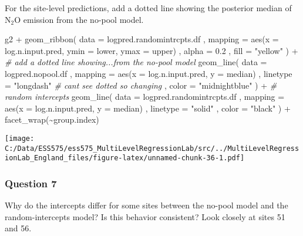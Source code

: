 \documentclass[
]{article}
\newenvironment{Shaded}{\begin{snugshade}}{\end{snugshade}}
\newcommand{\AttributeTok}[1]{\textcolor[rgb]{0.77,0.63,0.00}{#1}}
\newcommand{\CommentTok}[1]{\textcolor[rgb]{0.56,0.35,0.01}{\textit{#1}}}
\newcommand{\FloatTok}[1]{\textcolor[rgb]{0.00,0.00,0.81}{#1}}
\newcommand{\FunctionTok}[1]{\textcolor[rgb]{0.00,0.00,0.00}{#1}}
\newcommand{\NormalTok}[1]{#1}
\newcommand{\SpecialCharTok}[1]{\textcolor[rgb]{0.00,0.00,0.00}{#1}}
\newcommand{\StringTok}[1]{\textcolor[rgb]{0.31,0.60,0.02}{#1}}
\begin{document}
For the site-level predictions, add a dotted line showing the posterior
median of \(\textrm{N} _2 \textrm{O}\) emission from the no-pool model.

\begin{Shaded}
\begin{Highlighting}[]
\NormalTok{g2 }\SpecialCharTok{+}
  \FunctionTok{geom\_ribbon}\NormalTok{(}
    \AttributeTok{data =}\NormalTok{ logpred.randomintrcpts.df}
\NormalTok{    , }\AttributeTok{mapping =} \FunctionTok{aes}\NormalTok{(}\AttributeTok{x =}\NormalTok{ log.n.input.pred, }\AttributeTok{ymin =}\NormalTok{ lower, }\AttributeTok{ymax =}\NormalTok{ upper)}
\NormalTok{    , }\AttributeTok{alpha =} \FloatTok{0.2}
\NormalTok{    , }\AttributeTok{fill =} \StringTok{"yellow"}
\NormalTok{  ) }\SpecialCharTok{+}
  \CommentTok{\# add a dotted line showing...from the no{-}pool model}
  \FunctionTok{geom\_line}\NormalTok{(}
    \AttributeTok{data =}\NormalTok{ logpred.nopool.df}
\NormalTok{    , }\AttributeTok{mapping =} \FunctionTok{aes}\NormalTok{(}\AttributeTok{x =}\NormalTok{ log.n.input.pred, }\AttributeTok{y =}\NormalTok{ median)}
\NormalTok{    , }\AttributeTok{linetype =} \StringTok{"longdash"} \CommentTok{\# cant see dotted so changing }
\NormalTok{    , }\AttributeTok{color =} \StringTok{"midnightblue"}
\NormalTok{  ) }\SpecialCharTok{+}
  \CommentTok{\# random intercepts}
  \FunctionTok{geom\_line}\NormalTok{(}
    \AttributeTok{data =}\NormalTok{ logpred.randomintrcpts.df}
\NormalTok{    , }\AttributeTok{mapping =} \FunctionTok{aes}\NormalTok{(}\AttributeTok{x =}\NormalTok{ log.n.input.pred, }\AttributeTok{y =}\NormalTok{ median)}
\NormalTok{    , }\AttributeTok{linetype =} \StringTok{"solid"}
\NormalTok{    , }\AttributeTok{color =} \StringTok{"black"}
\NormalTok{  ) }\SpecialCharTok{+}
  \FunctionTok{facet\_wrap}\NormalTok{(}\SpecialCharTok{\textasciitilde{}}\NormalTok{group.index)}
\end{Highlighting}
\end{Shaded}

\texttt{[image: C:/Data/ESS575/ess575\_MultiLevelRegressionLab/src/../MultiLevelRegressionLab\_England\_files/figure-latex/unnamed-chunk-36-1.pdf]}

\hypertarget{question-7}{%
\subsubsection{Question 7}\label{question-7}}

Why do the intercepts differ for some sites between the no-pool model
and the random-intercepts model? Is this behavior consistent? Look
closely at sites 51 and 56.
\end{document}
